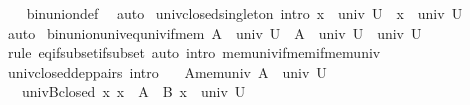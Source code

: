 \begin{isabellebody}
%
\isadelimproof
\ \ %
\endisadelimproof
%
\isatagproof
{}\isamarkupfalse%
\ bin{\isacharunderscore}{\kern0pt}union{\isacharunderscore}{\kern0pt}def\ \isamarkupfalse%
\ auto%
\endisatagproof
{\isafoldproof}%
%
\isadelimproof
\isanewline
%
\endisadelimproof
\isanewline
{}\isamarkupfalse%
\ univ{\isacharunderscore}{\kern0pt}closed{\isacharunderscore}{\kern0pt}singleton\ {\isacharbrackleft}{\kern0pt}intro{\isacharbang}{\kern0pt}{\isacharbrackright}{\kern0pt}{\isacharcolon}{\kern0pt}\ {\isachardoublequoteopen}x\ {\isasymin}\ univ\ U\ {\isasymLongrightarrow}\ {\isacharbraceleft}{\kern0pt}x{\isacharbraceright}{\kern0pt}\ {\isasymin}\ univ\ U{\isachardoublequoteclose}\isanewline
%
\isadelimproof
\ \ %
\endisadelimproof
%
\isatagproof
{}\isamarkupfalse%
\ auto%
\endisatagproof
{\isafoldproof}%
%
\isadelimproof
\isanewline
%
\endisadelimproof
\isanewline
{}\isamarkupfalse%
\ bin{\isacharunderscore}{\kern0pt}union{\isacharunderscore}{\kern0pt}univ{\isacharunderscore}{\kern0pt}eq{\isacharunderscore}{\kern0pt}univ{\isacharunderscore}{\kern0pt}if{\isacharunderscore}{\kern0pt}mem{\isacharcolon}{\kern0pt}\ {\isachardoublequoteopen}A\ {\isasymin}\ univ\ U\ {\isasymLongrightarrow}\ A\ {\isasymunion}\ univ\ U\ {\isacharequal}{\kern0pt}\ univ\ U{\isachardoublequoteclose}\isanewline
%
\isadelimproof
\ \ %
\endisadelimproof
%
\isatagproof
{}\isamarkupfalse%
\ {\isacharparenleft}{\kern0pt}rule\ eq{\isacharunderscore}{\kern0pt}if{\isacharunderscore}{\kern0pt}subset{\isacharunderscore}{\kern0pt}if{\isacharunderscore}{\kern0pt}subset{\isacharparenright}{\kern0pt}\ {\isacharparenleft}{\kern0pt}auto\ intro{\isacharcolon}{\kern0pt}\ mem{\isacharunderscore}{\kern0pt}univ{\isacharunderscore}{\kern0pt}if{\isacharunderscore}{\kern0pt}mem{\isacharunderscore}{\kern0pt}if{\isacharunderscore}{\kern0pt}mem{\isacharunderscore}{\kern0pt}univ{\isacharparenright}{\kern0pt}%
\endisatagproof
{\isafoldproof}%
%
\isadelimproof
\isanewline
%
\endisadelimproof
\isanewline
{}\isamarkupfalse%
\ univ{\isacharunderscore}{\kern0pt}closed{\isacharunderscore}{\kern0pt}dep{\isacharunderscore}{\kern0pt}pairs\ {\isacharbrackleft}{\kern0pt}intro{\isacharbang}{\kern0pt}{\isacharbrackright}{\kern0pt}{\isacharcolon}{\kern0pt}\isanewline
\ \ \ A{\isacharunderscore}{\kern0pt}mem{\isacharunderscore}{\kern0pt}univ{\isacharcolon}{\kern0pt}\ {\isachardoublequoteopen}A\ {\isasymin}\ univ\ U{\isachardoublequoteclose}\isanewline
\ \ \ univ{\isacharunderscore}{\kern0pt}B{\isacharunderscore}{\kern0pt}closed{\isacharcolon}{\kern0pt}\ {\isachardoublequoteopen}{\isasymAnd}x{\isachardot}{\kern0pt}\ x\ {\isasymin}\ A\ {\isasymLongrightarrow}\ B\ x\ {\isasymin}\ univ\ U{\isachardoublequoteclose}\isanewline

\end{isabellebody}

